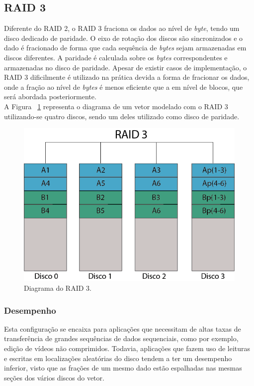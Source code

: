 \subsection{RAID 3}

Diferente do RAID 2, o RAID 3 fraciona os dados ao nível de \textit{byte}, tendo um disco dedicado de paridade. O eixo de rotação dos discos são sincronizados e o dado é fracionado de forma que cada sequência de \textit{bytes} sejam armazenadas em discos diferentes. A paridade é calculada sobre os \textit{bytes} correspondentes e armazenadas no disco de paridade. Apesar de existir casos de implementação, o RAID 3 dificilmente é utilizado na prática devida a forma de fracionar os dados, onde a fração ao nível de \textit{bytes} é menos eficiente que a em nível de blocos, que será abordada posteriormente.\\

A Figura ~\ref{fig:raid3} representa o diagrama de um vetor modelado com o RAID 3 utilizando-se quatro discos, sendo um deles utilizado como disco de paridade.\\

\begin{figure}[htb]
	\begin{center}
		
		\includegraphics[clip,scale=0.5]{images/RAID_3.png}
		\caption{Diagrama do RAID 3. }
		\label{fig:raid3}
	\end{center}
\end{figure} 

\subsubsection{Desempenho}
Esta configuração se encaixa para aplicações que necessitam de altas taxas de transferência de grandes sequências de dados sequenciais, como por exemplo, edição de vídeos não comprimidos. Todavia, aplicações que fazem uso de leituras e escritas em localizações aleatórias do disco tendem a ter um desempenho inferior, visto que as frações de um mesmo dado estão espalhadas nas mesmas seções dos vários discos do vetor.\\

